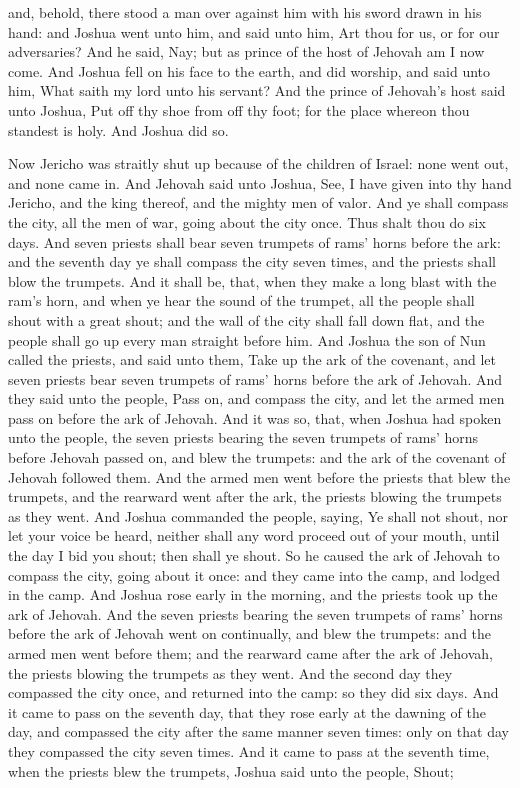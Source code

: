 and, behold, there stood a man over against him with his sword drawn in his hand: and Joshua went unto him, and said unto him, Art thou for us, or for our adversaries? And he said, Nay; but as prince of the host of Jehovah am I now come. And Joshua fell on his face to the earth, and did worship, and said unto him, What saith my lord unto his servant? And the prince of Jehovah’s host said unto Joshua, Put off thy shoe from off thy foot; for the place whereon thou standest is holy. And Joshua did so. 

Now Jericho was straitly shut up because of the children of Israel: none went out, and none came in. And Jehovah said unto Joshua, See, I have given into thy hand Jericho, and the king thereof, and the mighty men of valor. And ye shall compass the city, all the men of war, going about the city once. Thus shalt thou do six days. And seven priests shall bear seven trumpets of rams’ horns before the ark: and the seventh day ye shall compass the city seven times, and the priests shall blow the trumpets. And it shall be, that, when they make a long blast with the ram’s horn, and when ye hear the sound of the trumpet, all the people shall shout with a great shout; and the wall of the city shall fall down flat, and the people shall go up every man straight before him. And Joshua the son of Nun called the priests, and said unto them, Take up the ark of the covenant, and let seven priests bear seven trumpets of rams’ horns before the ark of Jehovah. And they said unto the people, Pass on, and compass the city, and let the armed men pass on before the ark of Jehovah.  And it was so, that, when Joshua had spoken unto the people, the seven priests bearing the seven trumpets of rams’ horns before Jehovah passed on, and blew the trumpets: and the ark of the covenant of Jehovah followed them. And the armed men went before the priests that blew the trumpets, and the rearward went after the ark, the priests blowing the trumpets as they went. And Joshua commanded the people, saying, Ye shall not shout, nor let your voice be heard, neither shall any word proceed out of your mouth, until the day I bid you shout; then shall ye shout. So he caused the ark of Jehovah to compass the city, going about it once: and they came into the camp, and lodged in the camp.  And Joshua rose early in the morning, and the priests took up the ark of Jehovah. And the seven priests bearing the seven trumpets of rams’ horns before the ark of Jehovah went on continually, and blew the trumpets: and the armed men went before them; and the rearward came after the ark of Jehovah, the priests blowing the trumpets as they went. And the second day they compassed the city once, and returned into the camp: so they did six days.  And it came to pass on the seventh day, that they rose early at the dawning of the day, and compassed the city after the same manner seven times: only on that day they compassed the city seven times. And it came to pass at the seventh time, when the priests blew the trumpets, Joshua said unto the people, Shout; 